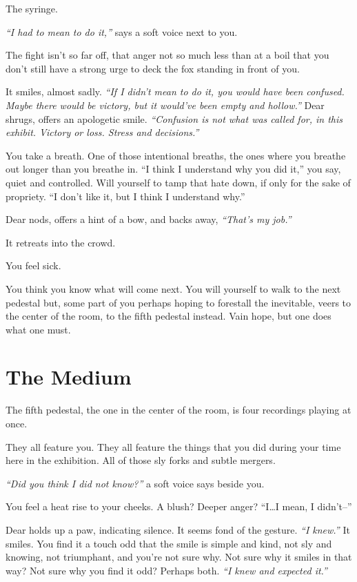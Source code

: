 The syringe.

\emph{``I had to mean to do it,''} says a soft voice next to you.

The fight isn't so far off, that anger not so much less than at a boil that you don't still have a strong urge to deck the fox standing in front of you.

It smiles, almost sadly. \emph{``If I didn't mean to do it, you would have been confused. Maybe there would be victory, but it would've been empty and hollow.''} Dear shrugs, offers an apologetic smile. \emph{``Confusion is not what was called for, in this exhibit. Victory or loss. Stress and decisions.''}

You take a breath. One of those intentional breaths, the ones where you breathe out longer than you breathe in. ``I think I understand why you did it,'' you say, quiet and controlled. Will yourself to tamp that hate down, if only for the sake of propriety. ``I don't like it, but I think I understand why.''

Dear nods, offers a hint of a bow, and backs away, \emph{``That's my job.''}

It retreats into the crowd.

You feel sick.

You think you know what will come next. You will yourself to walk to the next pedestal but, some part of you perhaps hoping to forestall the inevitable, veers to the center of the room, to the fifth pedestal instead. Vain hope, but one does what one must.

\newpage
\section*{The Medium}

The fifth pedestal, the one in the center of the room, is four recordings playing at once.

They all feature you. They all feature the things that you did during your time here in the exhibition. All of those sly forks and subtle mergers.

\emph{``Did you think I did not know?''} a soft voice says beside you.

You feel a heat rise to your cheeks. A blush? Deeper anger? ``I\ldots{}I mean, I didn't--''

Dear holds up a paw, indicating silence. It seems fond of the gesture. \emph{``I knew.''} It smiles. You find it a touch odd that the smile is simple and kind, not sly and knowing, not triumphant, and you're not sure why. Not sure why it smiles in that way? Not sure why you find it odd? Perhaps both. \emph{``I knew and expected it.''}

